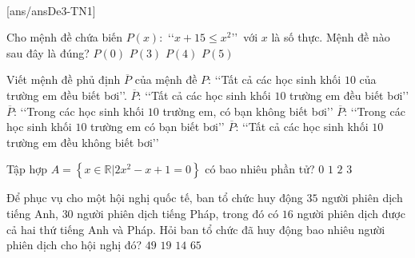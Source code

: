 ﻿﻿\begin{name}
	{\tenchude}
	{\tendethi}
	{\tentruong}
	{\thoigian}
\end{name}
\setcounter{ex}{0}\setcounter{bt}{0}
\TN
{}[ans/ansDe3-TN1]
\begin{ex}%
	Cho mệnh đề chứa biến $P(x)\colon$  \lq\lq  $x+15 \leq x^2$\rq\rq\, với $x$ là số thực. Mệnh đề nào sau đây là đúng?
	\choice
	{$P(0)$}
	{ $P(3)$}
	{ $P(4)$}
	{\True $P(5)$ }
\end{ex}

\begin{ex}%
	Viết mệnh đề phủ định $\overline P$ của mệnh đề $P$: \lq\lq  Tất cả các học sinh khối $10$ của trường em đều biết bơi\rq\rq.
	\choice
	{$\overline P $: \lq\lq  Tất cả các học sinh khối $10$ trường em đều biết bơi\rq\rq}
	{\True $\overline P $: \lq\lq  Trong các học sinh khối $10$ trường em, có bạn không biết bơi\rq\rq}
	{$\overline P $: \lq\lq  Trong các học sinh khối $10$ trường em có bạn biết bơi\rq\rq}
	{$\overline P $: \lq\lq  Tất cả các học sinh khối $10$ trường em đều không biết bơi\rq\rq}
\end{ex}

\begin{ex}%
	Tập hợp $A=\left\{x\in \mathbb{R}\big| 2x^2-x+1=0\right\}$ có bao nhiêu phần tử?
	\choice
	{\True $0$}
	{$1$}
	{$2$}
	{$3$}
\end{ex}

\begin{ex}%
	Để phục vụ cho một hội nghị quốc tế, ban tổ chức huy động $35$ người phiên dịch tiếng Anh, $30$ người phiên dịch tiếng Pháp, trong đó có $16$ người phiên dịch được cả hai thứ tiếng Anh và Pháp. Hỏi ban tổ chức đã huy động bao nhiêu người phiên dịch cho hội nghị đó?
	\choice
	{\True $49$}
	{$19$}
	{$14$}
	{$65$}
\end{ex}

